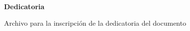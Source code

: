 \begin{center}

    \textbf{Dedicatoria}\par
    
\end{center}

Archivo para la inscripción de la dedicatoria del documento